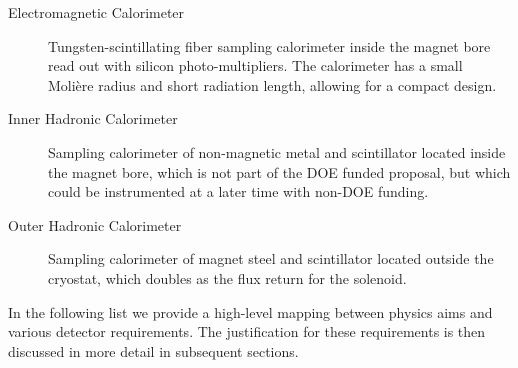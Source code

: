 \begin{description}
\begin{description}
\end{description}

\item[Electromagnetic Calorimeter] Tungsten-scintillating fiber
  sampling calorimeter inside the magnet bore read out with silicon
  photo-multipliers.  The calorimeter has a small Moli\`ere radius and
  short radiation length, allowing for a compact design.

\item[Inner Hadronic Calorimeter] Sampling calorimeter of non-magnetic
  metal and scintillator located inside the magnet bore, which is not part of the
  DOE funded proposal, but which could be instrumented at a later time with 
  non-DOE funding.

\item[Outer Hadronic Calorimeter] Sampling calorimeter of magnet steel
  and scintillator located outside the cryostat, which doubles as the flux
  return for the solenoid.

\end{description}

In the following list we provide a high-level mapping between physics
aims and various detector requirements.  The justification for these
requirements is then discussed in more detail in subsequent sections.

